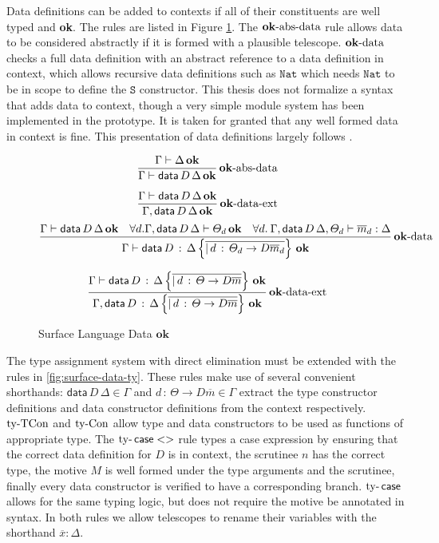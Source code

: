 Data definitions can be added to contexts if all of their constituents are well typed and \textbf{ok}.
The rules are listed in Figure \ref{fig:surface-data-ok}.
The $\operatorname{\mathbf{ok}-abs-data}$ rule allows data to be considered abstractly if it is formed with a plausible telescope.
$\operatorname{\mathbf{ok}-data}$ checks a full data definition with an abstract reference to a data definition in context, which allows recursive data definitions such as $\mathtt{Nat}$ which needs $\mathtt{Nat}$ to be in scope to define the $\mathtt{S}$ constructor.
This thesis does not formalize a syntax that adds data to context, though a very simple module system has been implemented in the prototype.
It is taken for granted that any well formed data in context is fine.
This presentation of data definitions largely follows \cite{sjoberg2012irrelevance}. 

\begin{figure}
\[
\frac{\Gamma\vdash\Delta\,\mathbf{ok}}{\Gamma\vdash\mathsf{data}\,D\,\Delta\,\mathbf{ok}}\operatorname{\mathbf{ok}-abs-data}
\]

\[
\frac{\Gamma\vdash\mathsf{data}\,D\,\Delta\,\mathbf{ok}}{\Gamma,\mathsf{data}\,D\,\Delta\,\mathbf{ok}}\operatorname{\mathbf{ok}-data-ext}
\]
\[
\frac{\Gamma\vdash\mathsf{data}\,D\,\Delta\,\mathbf{ok}\quad\forall d.\Gamma,\mathsf{data}\,D\,\Delta\vdash\varTheta_{d}\,\mathbf{ok}\quad\forall d.\:\Gamma,\mathsf{data}\,D\,\Delta,\varTheta_{d}\vdash\overline{m}_{d}:\Delta}{\Gamma\vdash\mathsf{data}\,D\,:\,\Delta\left\{ \overline{|\,d\,:\,\varTheta_{d}\rightarrow D\overline{m}_{d}}\right\} \,\mathbf{ok}}\operatorname{\mathbf{ok}-data}
\]

\[
\frac{\Gamma\vdash\mathsf{data}\,D\,:\,\Delta\left\{ \overline{|\,d\,:\,\varTheta\rightarrow D\overline{m}}\right\} \,\mathbf{ok}}{\Gamma,\mathsf{data}\,D\,:\,\Delta\left\{ \overline{|\,d\,:\,\varTheta\rightarrow D\overline{m}}\right\} \,\mathbf{ok}}\operatorname{\mathbf{ok}-data-ext}
\]

\caption{Surface Language Data $\mathbf{ok}$}
\label{fig:surface-data-ok}
\end{figure}

The type assignment system with direct elimination must be extended with the rules in \ref{fig:surface-data-ty}.
These rules make use of several convenient shorthands: $\mathsf{data}\,D\,\Delta\in\Gamma$ and $d\,:\,\varTheta\rightarrow D\overline{m}\in\Gamma$ extract the type constructor definitions and data constructor definitions from the context respectively.
$\operatorname{ty-TCon}$ and $\operatorname{ty-Con}$ allow type and data constructors to be used as functions of appropriate type.
The $\operatorname{ty-}\mathsf{case}<>$ rule types a case expression by ensuring that the correct data definition for $D$ is in context, the scrutinee $n$ has the correct type, the motive $M$ is well formed under the type arguments and the scrutinee, %
  finally every data constructor is verified to have a corresponding branch.
$\operatorname{ty-}\mathsf{case}$ allows for the same typing logic, but does not require the motive be annotated in syntax.
In both rules we allow telescopes to rename their variables with the shorthand $\overline{x}:\Delta$.

